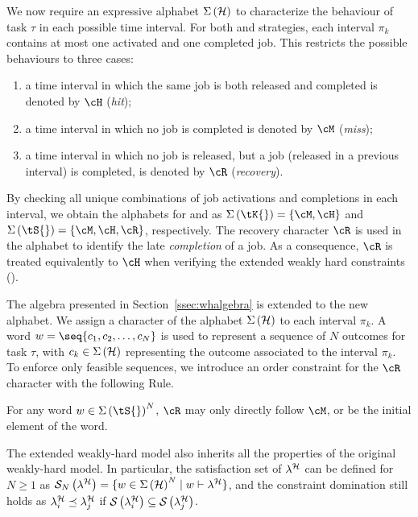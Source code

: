 We now require an expressive alphabet $\Sigma\left(\mathcal{H}\right)$ to characterize the behaviour of task $\tau$ in each possible time interval.
For both \tK{} and \tS{} strategies, each interval $\pi_k$ contains at most one activated and one completed job.
This restricts the possible behaviours to three cases:
\begin{enumerate}[label=(\roman*)]
    \item a time interval in which the same job is both released and completed is denoted by $\cH$ (\emph{hit});
    \item a time interval in which no job is completed is denoted by $\cM$ (\emph{miss});
    \item a time interval in which no job is released, but a job (released in a previous interval) is completed, is denoted by $\cR$ (\emph{recovery}).
\end{enumerate}
%
By checking all unique combinations of job activations and completions in each interval, we obtain the alphabets for \tK{} and \tS{} as $\Sigma\left(\tK{}\right) = \{ \cM, \cH \}$ and $\Sigma\left(\tS{}\right) = \{ \cM, \cH, \cR \}$, respectively.
The recovery character $\cR$ is used in the \tS{} alphabet to identify the late \emph{completion} of a job.
As a consequence, $\cR$ is treated equivalently to $\cH$ when verifying the extended weakly hard constraints (\ewhc{}).


The algebra presented in Section~\ref{ssec:whalgebra} is extended to the new alphabet.
We assign a character of the alphabet $\Sigma\left(\mathcal{H}\right)$ to each interval $\pi_k$.
A word $w = \seq{c_1,c_2,\dots,c_N}$ is used to represent a sequence of $N$ outcomes for task $\tau$, with $c_k \in \Sigma\left(\mathcal{H}\right)$ representing the outcome associated to the interval $\pi_k$. 
To enforce only feasible sequences, we introduce an order constraint for the $\cR$ character with the following Rule.
%
\begin{rule_}%
    \label{rule:R}%
    For any word $w \in \Sigma\left(\tS{}\right)^N$, $\cR$ may only directly follow $\cM$, or be the initial element of the word.
\end{rule_}

The extended weakly-hard model also inherits all the properties of the original weakly-hard model.
In particular, the satisfaction set of $\lambda^{\mathcal{H}}$ can be defined for $N\geq 1$ as $\mathcal{S}_{N}\left( \lambda^{\mathcal{H}} \right) = \{ w \in \Sigma\left(\mathcal{H}\right)^N \mid w \vdash \lambda^{\mathcal{H}} \}$, and the constraint domination still holds as $\lambda^{\mathcal{H}}_{i} \preceq \lambda^{\mathcal{H}}_{j}$ if $\mathcal{S}_{}\left( \lambda^{\mathcal{H}}_{i} \right) \subseteq \mathcal{S}_{}\left( \lambda^{\mathcal{H}}_{j} \right)$.
